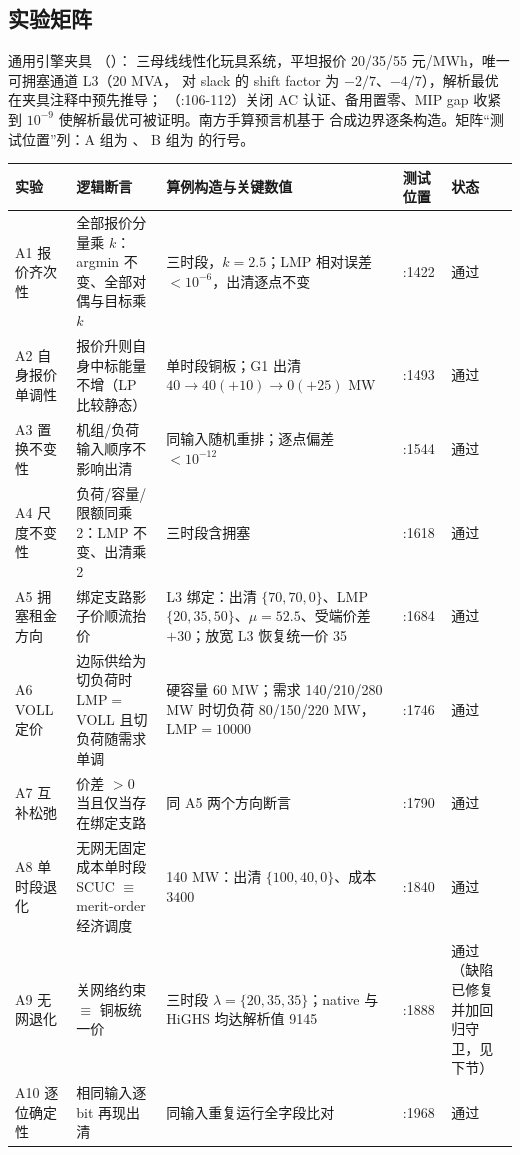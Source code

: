 \subsection{实验矩阵}
通用引擎夹具 （）：
三母线线性化玩具系统，平坦报价 20/35/55 元/MWh，唯一可拥塞通道 L3（20 MVA，
对 slack 的 shift factor 为 $-2/7$、$-4/7$），解析最优在夹具注释中预先推导；
（:106-112）关闭 AC 认证、备用置零、MIP gap 收紧到
$10^{-9}$ 使解析最优可被证明。南方手算预言机基于 
合成边界逐条构造。矩阵“测试位置”列：A 组为 、
B 组为  的行号。
\begin{center}\scriptsize
\begin{longtable}{@{}L{2.7cm}L{3.4cm}L{3.9cm}L{2.5cm}L{1.9cm}@{}}
\toprule 实验 & 逻辑断言 & 算例构造与关键数值 & 测试位置 & 状态\\\midrule
\endhead
A1 报价齐次性 & 全部报价分量乘 $k$：argmin 不变、全部对偶与目标乘 $k$ & 三时段，$k=2.5$；LMP 相对误差 $<10^{-6}$，出清逐点不变 & :1422 & 通过\\
A2 自身报价单调性 & 报价升则自身中标能量不增（LP 比较静态） & 单时段铜板；G1 出清 $40\to40(+10)\to0(+25)$ MW & :1493 & 通过\\
A3 置换不变性 & 机组/负荷输入顺序不影响出清 & 同输入随机重排；逐点偏差 $<10^{-12}$ & :1544 & 通过\\
A4 尺度不变性 & 负荷/容量/限额同乘 2：LMP 不变、出清乘 2 & 三时段含拥塞 & :1618 & 通过\\
A5 拥塞租金方向 & 绑定支路影子价顺流抬价 & L3 绑定：出清 $\{70,70,0\}$、LMP $\{20,35,50\}$、$\mu=52.5$、受端价差 $+30$；放宽 L3 恢复统一价 35 & :1684 & 通过\\
A6 VOLL 定价 & 边际供给为切负荷时 LMP$=$VOLL 且切负荷随需求单调 & 硬容量 60 MW；需求 140/210/280 MW 时切负荷 80/150/220 MW，LMP$=10000$ & :1746 & 通过\\
A7 互补松弛 & 价差 $>0$ 当且仅当存在绑定支路 & 同 A5 两个方向断言 & :1790 & 通过\\
A8 单时段退化 & 无网无固定成本单时段 SCUC $\equiv$ merit-order 经济调度 & 140 MW：出清 $\{100,40,0\}$、成本 $3400$ & :1840 & 通过\\
A9 无网退化 & 关网络约束 $\equiv$ 铜板统一价 & 三时段 $\lambda=\{20,35,35\}$；native 与 HiGHS 均达解析值 9145 & :1888 & 通过（缺陷已修复并加回归守卫，见下节）\\
A10 逐位确定性 & 相同输入逐 bit 再现出清 & 同输入重复运行全字段比对 & :1968 & 通过\\

\end{longtable}
\end{center}
